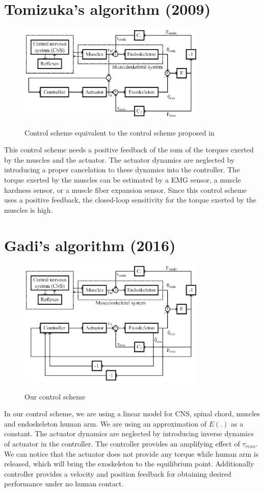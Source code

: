 \documentclass{article}
\begin{document}
\section{Tomizuka's algorithm (2009) \cite{kong2009control}}
\begin{figure}
  \centering
  \includegraphics[width=09cm]{images/Tomizuka_BD.eps}\\
  \caption{Control scheme equivalent to the control scheme proposed in \cite{kong2009control}}\label{Fig:Tomizuka_BD}
\end{figure}
This control scheme needs a positive feedback of the sum of the torques exerted by the muscles and the actuator. The actuator dynamics are neglected by introducing a proper cancelation to these dynamics into the controller. The torque exerted by the muscles can be estimated by a EMG sensor, a muscle hardness sensor, or a muscle fiber expansion sensor. Since this control scheme uses a positive feedback, the closed-loop sensitivity for the torque exerted by the muscles is high.
\section{Gadi's algorithm (2016) \cite{gadi2016stability}}
\begin{figure}
  \centering
  \includegraphics[width=09cm]{images/Our_BD.eps}\\
  \caption{Our control scheme}\label{Fig:Our_BD}
\end{figure}
In our control scheme, we are using a linear model for CNS, spinal chord, muscles and endoskeleton human arm. We are using an approximation of $E(.)$ as a constant. The actuator dynamics are neglected by introducing inverse dynamics of actuator in the controller. The controller provides an amplifying effect of $\tau_{rexo}$. We can notice that the actuator does not provide any torque while human arm is released, which will bring the exoskeleton to the equilibrium point. Additionally controller provides a velocity and position feedback for obtaining desired performance under no human contact.


\end{document}
